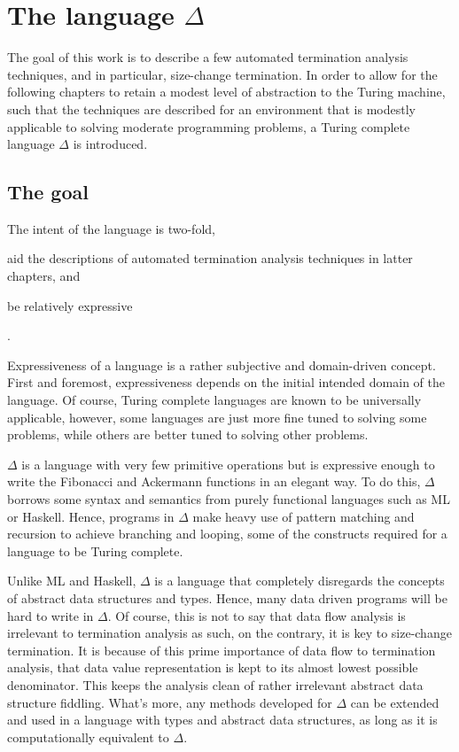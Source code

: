 \newcommand{\D}{$\Delta$}
\chapter{The language \D{}}

The goal of this work is to describe a few automated termination analysis
techniques, and in particular, size-change termination. In order to allow for
the following chapters to retain a modest level of abstraction to the Turing
machine, such that the techniques are described for an environment that is
modestly applicable to solving moderate programming problems, a Turing complete
language \D{} is introduced.

\section{The goal}

The intent of the language is two-fold, \begin{inparaenum}[(1)]\item aid the
descriptions of automated termination analysis techniques in latter
chapters, and \item be relatively expressive\end{inparaenum}.

Expressiveness of a language is a rather subjective and domain-driven concept.
First and foremost, expressiveness depends on the initial intended domain of
the language. Of course, Turing complete languages are known to be universally
applicable, however, some languages are just more fine tuned to solving some
problems, while others are better tuned to solving other problems.

\D{} is a language with very few primitive operations but is expressive enough
to write the Fibonacci and Ackermann functions in an elegant way. To do this,
\D{} borrows some syntax and semantics from purely functional languages such as
ML or Haskell. Hence, programs in \D{} make heavy use of pattern matching and
recursion to achieve branching and looping, some of the constructs required for
a language to be Turing complete.

Unlike ML and Haskell, \D{} is a language that completely disregards the
concepts of abstract data structures and types. Hence, many data driven
programs will be hard to write in \D{}. Of course, this is not to say that data
flow analysis is irrelevant to termination analysis as such, on the contrary,
it is key to size-change termination. It is because of this prime importance of
data flow to termination analysis, that data value representation is kept to
its almost lowest possible denominator. This keeps the analysis clean of rather
irrelevant abstract data structure fiddling. What's more, any methods developed
for \D{} can be extended and used in a language with types and abstract data
structures, as long as it is computationally equivalent to \D{}.

